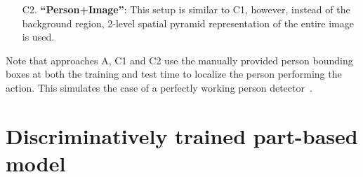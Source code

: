 \documentclass{bmvc2k}
\newcommand{\secnspc}{\vspace*{-3mm}}       %
\begin{document}
\begin{enumerate}
\item[C2.] {\bf ``Person+Image''}: This setup is similar to C1, however, instead of the background region, 2-level spatial pyramid representation of the entire image is used.  

\end{enumerate}

Note that approaches A, C1 and C2 use the manually provided person bounding boxes at both the training and test time
to localize the person performing the action.  
This simulates the case of a perfectly working person detector~\cite{Dalal05,Felzenszwalb09}.




\secnspc
\section{Discriminatively trained part-based model}
\secnspc
\label{sec:lsvm}
\end{document}
